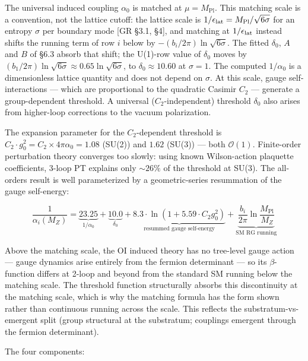 \documentclass[
]{article}
\begin{document}
The universal induced coupling \(\alpha_0\) is matched at
\(\mu = M_{\text{Pl}}\). This matching scale is a convention, not the
lattice cutoff: the lattice scale is
\(1/\epsilon_{\rm lat} = M_{\text{Pl}}/\sqrt{6\sigma}\) for an entropy
\(\sigma\) per boundary mode {[}GR §3.1, §4{]}, and matching at
\(1/\epsilon_{\rm lat}\) instead shifts the running term of row \(i\)
below by \(-(b_i/2\pi)\ln\sqrt{6\sigma}\). The fitted \(\delta_0\),
\(A\) and \(B\) of §6.3 absorb that shift; the U(1)-row value of
\(\delta_0\) moves by
\((b_1/2\pi)\ln\sqrt{6\sigma} \approx 0.65\ln\sqrt{6\sigma}\), to
\(\delta_0 \approx 10.60\) at \(\sigma = 1\). The computed
\(1/\alpha_0\) is a dimensionless lattice quantity and does not depend
on \(\sigma\). At this scale, gauge self-interactions --- which are
proportional to the quadratic Casimir \(C_2\) --- generate a
group-dependent threshold. A universal (\(C_2\)-independent) threshold
\(\delta_0\) also arises from higher-loop corrections to the vacuum
polarization.

The expansion parameter for the \(C_2\)-dependent threshold is
\(C_2 \cdot g_0^2 = C_2 \times 4\pi\alpha_0 = 1.08\) (SU(2)) and
\(1.62\) (SU(3)) --- both \(\mathcal{O}(1)\). Finite-order perturbation
theory converges too slowly: using known Wilson-action plaquette
coefficients, 3-loop PT explains only \(\sim 26\%\) of the threshold at
SU(3). The all-orders result is well parameterized by a geometric-series
resummation of the gauge self-energy:

\[\frac{1}{\alpha_i(M_Z)} = \underbrace{23.25}_{1/\alpha_0} + \underbrace{10.0}_{\delta_0} + \underbrace{8.3 \cdot \ln\!\left(1 + 5.59 \cdot C_2 g_0^2\right)}_{\text{resummed gauge self-energy}} + \underbrace{\frac{b_i}{2\pi}\ln\frac{M_{\text{Pl}}}{M_Z}}_{\text{SM RG running}}\]

Above the matching scale, the OI induced theory has no tree-level gauge
action --- gauge dynamics arise entirely from the fermion determinant
--- so its \(\beta\)-function differs at 2-loop and beyond from the
standard SM running below the matching scale. The threshold function
structurally absorbs this discontinuity at the matching scale, which is
why the matching formula has the form shown rather than continuous
running across the scale. This reflects the substratum-vs-emergent split
(group structural at the substratum; couplings emergent through the
fermion determinant).

The four components:
\end{document}
